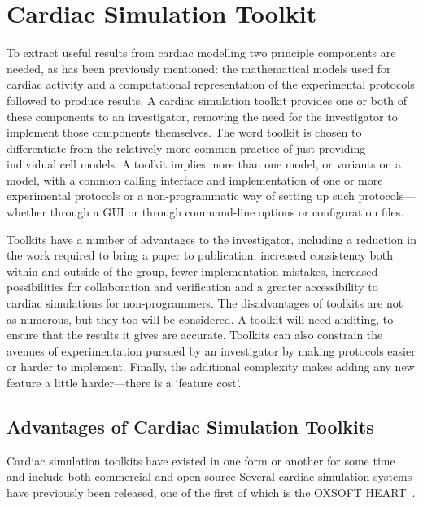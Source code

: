 \section{Cardiac Simulation Toolkit}

To extract useful results from cardiac modelling two principle components are
needed, as has been previously mentioned: the mathematical models used for
cardiac activity and a computational representation of the experimental
protocols followed to produce results.  A cardiac simulation toolkit provides
one or both of these components to an investigator, removing the need for the
investigator to implement those components themselves.  The word toolkit is
chosen to differentiate from the relatively more common practice of just
providing individual cell models.  A toolkit implies more than one model, or
variants on a model, with a common calling interface and implementation of one
or more experimental protocols or a non-programmatic way of setting up such
protocols---whether through a GUI or through command-line options or
configuration files.

Toolkits have a number of advantages to the investigator, including a reduction
in the work required to bring a paper to publication, increased consistency both
within and outside of the group, fewer implementation mistakes, increased
possibilities for collaboration and verification and a greater accessibility to
cardiac simulations for non-programmers.  The disadvantages of toolkits are not
as numerous, but they too will be considered.  A toolkit will need auditing, to
ensure that the results it gives are accurate.  Toolkits can also constrain the
avenues of experimentation pursued by an investigator by making protocols easier
or harder to implement.  Finally, the additional complexity makes adding any new
feature a little harder---there is a `feature cost'.

\subsection{Advantages of Cardiac Simulation Toolkits}



Cardiac simulation toolkits have existed in one form or another for some
time and include both commercial and open source 
Several cardiac simulation systems have previously been released, one of
the first of which is the OXSOFT HEART~\cite{Noble-1999}.
